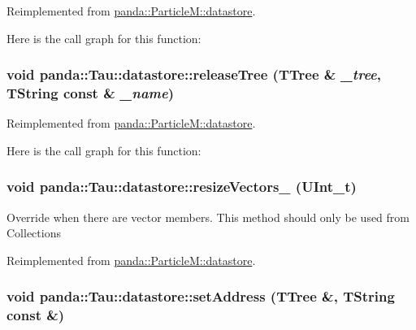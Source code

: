 Reimplemented from \hyperlink{structpanda_1_1ParticleM_1_1datastore_a4069b8cdca5715ed6faf0a7907ea8386}{panda::ParticleM::datastore}.

Here is the call graph for this function:\hypertarget{structpanda_1_1Tau_1_1datastore_ad3b1c3b063d8091225a37315a6dfb998}{
\subsubsection[{releaseTree}]{\setlength{\rightskip}{0pt plus 5cm}void panda::Tau::datastore::releaseTree (TTree \& {\em \_\-tree}, \/  TString const \& {\em \_\-name})}}
\label{structpanda_1_1Tau_1_1datastore_ad3b1c3b063d8091225a37315a6dfb998}


Reimplemented from \hyperlink{structpanda_1_1ParticleM_1_1datastore_ad6986990fa55f1c6ca4e92db28486922}{panda::ParticleM::datastore}.

Here is the call graph for this function:\hypertarget{structpanda_1_1Tau_1_1datastore_a1dce455474842a78eb6a7ab7b3271f3a}{
\subsubsection[{resizeVectors\_\-}]{\setlength{\rightskip}{0pt plus 5cm}void panda::Tau::datastore::resizeVectors\_\- (UInt\_\-t)}}
\label{structpanda_1_1Tau_1_1datastore_a1dce455474842a78eb6a7ab7b3271f3a}


Override when there are vector members. This method should only be used from Collections 

Reimplemented from \hyperlink{structpanda_1_1ParticleM_1_1datastore_a6dd61d4a8f70e81a1638757a5edbc7ed}{panda::ParticleM::datastore}.\hypertarget{structpanda_1_1Tau_1_1datastore_a4cbb512cb1da538b968aa7bfea700f2b}{
\subsubsection[{setAddress}]{\setlength{\rightskip}{0pt plus 5cm}void panda::Tau::datastore::setAddress (TTree \&, \/  TString const \&)}}
\label{structpanda_1_1Tau_1_1datastore_a4cbb512cb1da538b968aa7bfea700f2b}


